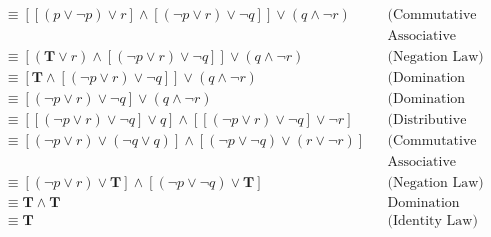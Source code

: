 \begin{itemize}
\begin{enumerate}[a.]
\begin{align*}
                         & \equiv [[(p \lor \neg p) \lor r] \land [(\neg p \lor r) \lor \neg q]] \lor (q \land \neg r)     &  & \text{(Commutative \&}          \\
                         &                                                                                                 &  & \text{Associative Law)}         \\
                         & \equiv [(\mathbf{T} \lor r) \land [(\neg p \lor r) \lor \neg q]] \lor (q \land \neg r)          &  & \text{(Negation Law)}           \\
                         & \equiv [\mathbf{T} \land [(\neg p \lor r) \lor \neg q]] \lor (q \land \neg r)                   &  & \text{(Domination Law)}         \\
                         & \equiv [(\neg p \lor r) \lor \neg q] \lor (q \land \neg r)                                      &  & \text{(Domination Law)}         \\
                         & \equiv [[(\neg p \lor r) \lor \neg q] \lor q] \land [[(\neg p \lor r) \lor \neg q] \lor \neg r] &  & \text{(Distributive Law)}       \\
                         & \equiv [(\neg p \lor r) \lor (\neg q \lor q)] \land [(\neg p \lor \neg q) \lor (r \lor \neg r)] &  & \text{(Commutative \&}          \\
                         &                                                                                                 &  & \text{Associative Law)}         \\
                         & \equiv [(\neg p \lor r) \lor \mathbf{T}] \land [(\neg p \lor \neg q) \lor \mathbf{T}]           &  & \text{(Negation Law)}           \\
                         & \equiv \mathbf{T} \land \mathbf{T}                                                              &  & \text{Domination Law}           \\
                         & \equiv \mathbf{T}                                                                               &  & \text{(Identity Law)}           \\
                    \end{align*}


\end{enumerate}
\end{itemize}
